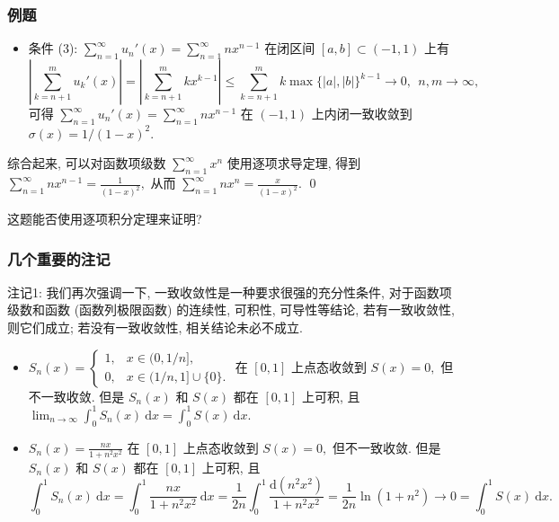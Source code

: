 
\begin{frame}
\frametitle{例题}

\begin{itemize}
\item 条件 (3): $\sum_{n=1}^\infty u_n'(x) = \sum_{n=1}^\infty n x^{n-1}$ 在闭区间 $[a, b] \subset (-1, 1)$ 上有
\[
\left| \sum_{k=n+1}^m u_k'(x) \right| = \left| \sum_{k=n+1}^m k x^{k-1} \right| \leqslant \sum_{k=n+1}^m k \max\{|a|, |b|\}^{k-1} \to 0, ~~ n, m \to \infty,
\]
可得 $\sum_{n=1}^\infty u_n'(x) = \sum_{n=1}^\infty n x^{n-1}$ 在 $(-1, 1)$ 上内闭一致收敛到 $\sigma(x) = 1/(1 - x)^2.$
\end{itemize}
\pause
综合起来, 可以对函数项级数 $\displaystyle \sum_{n=1}^\infty x^n$ 使用逐项求导定理, 得到 $\displaystyle \sum_{n=1}^\infty n x^{n-1} = \frac{1}{(1 - x)^2},$ 从而 $\displaystyle \sum_{n=1}^\infty n x^{n} = \frac{x}{(1 - x)^2}.$
\qed

\pause
\vspace{0.5em}

\begin{question}
这题能否使用逐项积分定理来证明?
\end{question}

\end{frame}


\begin{frame}
\frametitle{几个重要的注记}

{\color{red}} 注记1: 我们再次强调一下, 一致收敛性是一种要求很强的\alert{充分性条件}, 对于函数项级数和函数 (函数列极限函数) 的连续性, 可积性, 可导性等结论, 若有一致收敛性, 则它们成立; 若没有一致收敛性, 相关结论\alert{未必不成立}.

\pause
\vspace{0.5em}

\begin{eg}[可积性不需要一致收敛性的例子]
\begin{itemize}
\item $S_n(x) = \begin{cases} 1, & x \in (0, 1/n], \\ 0, & x \in (1/n, 1]\cup \{0\}. \end{cases}$ 在 $[0, 1]$ 上点态收敛到 $S(x) = 0,$ 但不一致收敛. 但是 $S_n(x)$ 和 $S(x)$ 都在 $[0, 1]$ 上可积, 且 $\displaystyle \lim_{n\to\infty} \int_0^1 S_n(x) ~ \mathrm{d}x = \int_0^1 S(x) ~ \mathrm{d}x.$
\pause
\item $S_n(x) = \frac{nx}{1 + n^2 x^2}$ 在 $[0, 1]$ 上点态收敛到 $S(x) = 0,$ 但不一致收敛. 但是 $S_n(x)$ 和 $S(x)$ 都在 $[0, 1]$ 上可积, 且 \[
\int_0^1 S_n(x) ~ \mathrm{d}x = \int_0^1 \frac{nx}{1 + n^2 x^2} ~ \mathrm{d}x = \frac{1}{2n} \int_0^1 \frac{\mathrm{d}(n^2 x^2)}{1 + n^2 x^2} = \frac{1}{2n} \ln(1 + n^2) \to 0 = \int_0^1 S(x) ~ \mathrm{d}x.
\]
\end{itemize}
\end{eg}

\end{frame}

